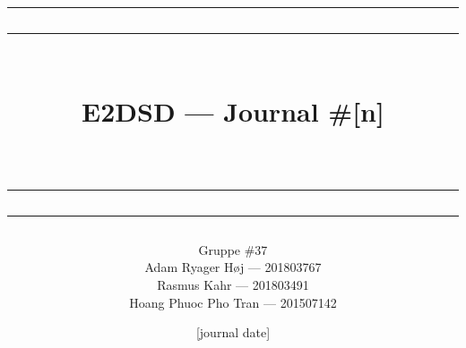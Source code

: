 \documentclass[10pt,a4paper,onesided]{article}
\newcommand\mymaketitle[1]{
   \rule{\textwidth}{1.6pt}\vspace*{-\baselineskip}\vspace*{2pt}
   \rule{\textwidth}{0.4pt}
   \\   
   \huge \bf #1\\
   \vspace{-8pt}
   \rule{\textwidth}{0.4pt}\vspace*{-\baselineskip}\vspace{3.2pt}
   \rule{\textwidth}{1.6pt}
}
\begin{document}

\title{
\mymaketitle{E2DSD --- Journal \#[n]\\[journal title]} %
}
\author{
   Gruppe \#37\\
   Adam Ryager Høj --- 201803767\\
   Rasmus Kahr --- 201803491\\
   Hoang Phuoc Pho Tran --- 201507142
}
\date{[journal date]} %

\maketitle
\clearpage

\tableofcontents
\clearpage

\lstlistoflistings
\listoffigures
\clearpage

\end{document}
